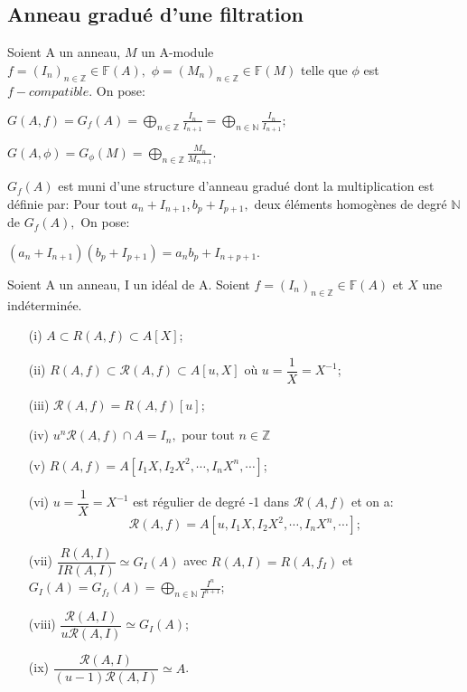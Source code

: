 \subsection{Anneau gradué d'une filtration}
\begin{madefinition}
	Soient A un anneau, $M$ un A-module\\
	$f=(I_{n})_{n\in \mathbb{Z}}\in \mathbb{F}(A),$ $\phi =(M_{n})_{n\in \mathbb{Z}}\in \mathbb{F}(M)$ telle que $\phi $ est $f-compatible$. On pose:
	
	$G(A,f)= G_{f}(A)=\displaystyle \bigoplus_{n \in \mathbb{Z}}{\frac{I_{n}}{I_{n+1}}} = \displaystyle \bigoplus_{n \in \mathbb{N}}{\frac{I_{n}}{I_{n+1}}}; $
	
	$G(A, \phi)=G_{\phi }(M)=\displaystyle \bigoplus_{n \in \mathbb{Z}}{\frac{M_{n}}{M_{n+1}}}.$
	
	$G_{f}(A)$ est muni d'une structure d'anneau gradué dont la multiplication est définie par:
	Pour tout $a_{n}+I_{n+1},b_{p}+I_{p+1},$ deux éléments homogènes de degré $\mathbb{N}$ de $G_{f}(A),$ On pose:
	
	$(a_{n}+I_{n+1})(b_{p}+I_{p+1})=a_{n}b_{p}+I_{n+p+1}.$
\end{madefinition}
\begin{maproposition}
	Soient A un anneau, I un idéal de A. Soient $f = (I_n)_{n \in \mathbb{Z}} \in \mathbb{F}(A)$ et $X$ une indéterminée.
	\begin{enumerate}
		\item[(i)] $A \subset R(A,f) \subset A[X]$;
		\item[(ii)] $R(A,f) \subset \mathcal{R}(A,f) \subset A[u,X]$ où $u = \dfrac{1}{X} = X^{-1}$;
		\item[(iii)] $\mathcal{R}(A,f) = R(A,f)[u] $;
		\item[(iv)] $u^n\mathcal{R}(A,f) \cap  A = I_n, \text{ pour tout } n \in \mathbb{Z}$
		\item[(v)] $R(A,f) = A[I_1X,I_2X^2, \cdots, I_nX^n, \cdots] $;
		\item[(vi)] $u=\dfrac{1}{X} = X ^{-1}$ est régulier de degré -1 dans $\mathcal{R}(A,f)$ et on a: \[ \mathcal{R}(A,f) = A[u,I_1X,I_2X^2, \cdots, I_nX^n, \cdots ]; \]
		\item[(vii)] $ \dfrac{R(A,I)}{IR(A,I)} \simeq G_I(A) $ avec $R(A,I) = R(A, f_I) $ et $G_I(A) = G_{f_{I}}(A) = \displaystyle \bigoplus_{n \in\mathbb{N}}{\frac{I^{n}}{I^{n+1}}} $;
		\item[(viii)] $ \dfrac{\mathcal{R}(A,I)}{u\mathcal{R}(A,I)} \simeq G_I(A) $;
		\item[(ix)] $ \dfrac{\mathcal{R}(A,I)}{(u-1)\mathcal{R}(A,I)} \simeq A $.
	\end{enumerate} 
\end{maproposition}
